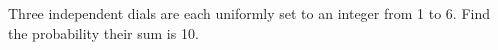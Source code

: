 Three independent dials are each uniformly set to an integer from 1 to 6. Find the probability their sum is 10.

